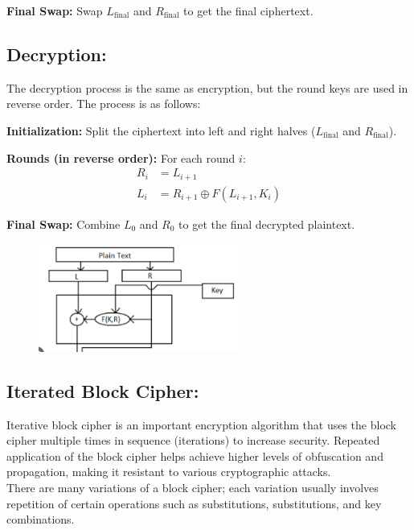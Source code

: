 \documentclass[11pt]{article}
\begin{document}
\textbf{Final Swap:} Swap $L_{\text{final}}$ and $R_{\text{final}}$ to get the final ciphertext.

\subsection*{Decryption:}
The decryption process is the same as encryption, but the round keys are used in reverse order. The process is as follows:

\textbf{Initialization:} Split the ciphertext into left and right halves ($L_{\text{final}}$ and $R_{\text{final}}$).

\textbf{Rounds (in reverse order):} For each round $i$:
\begin{align*}
R_i &= L_{i+1} \\
L_i &= R_{i+1} \oplus F(L_{i+1}, K_i)
\end{align*}

\textbf{Final Swap:} Combine $L_0$ and $R_0$ to get the final decrypted plaintext.


\begin{figure}
    \centering
    \includegraphics[width=0.6\textwidth]{image2.2.PNG} %
    \caption{} %
\end{figure}



\subsection{Iterated Block Cipher:}
Iterative block cipher is an important encryption algorithm that uses the block cipher multiple times in sequence (iterations) to increase security. Repeated application of the block cipher helps achieve higher levels of obfuscation and propagation, making it resistant to various cryptographic attacks.
\\
There are many variations of a block cipher; each variation usually involves repetition of certain operations such as substitutions, substitutions, and key combinations.\\
\end{document}
